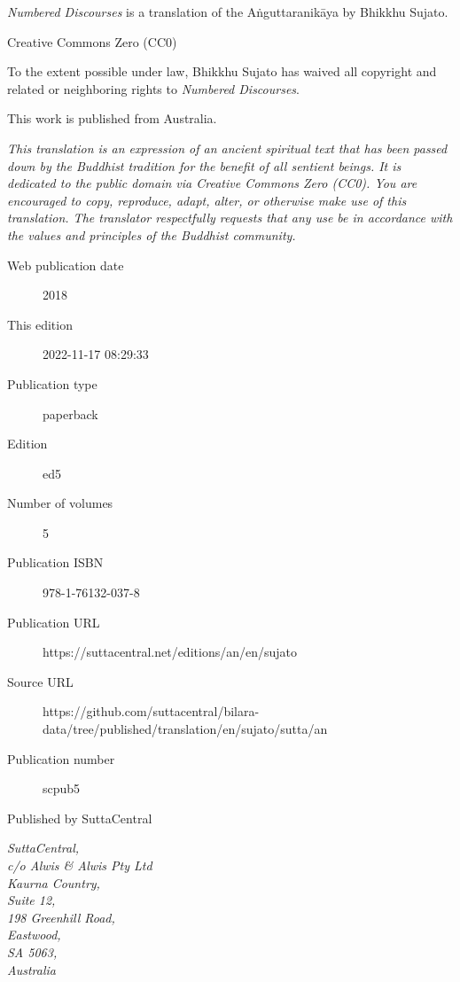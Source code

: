 \documentclass[12pt,openany]{book}%
\begin{document}
\begin{footnotesize}

\textit{Numbered Discourses} is a translation of the Aṅguttaranikāya by Bhikkhu Sujato.

\medskip

Creative Commons Zero (CC0)

To the extent possible under law, Bhikkhu Sujato has waived all copyright and related or neighboring rights to \textit{Numbered Discourses}.

\medskip

This work is published from Australia.

\begin{center}
\textit{This translation is an expression of an ancient spiritual text that has been passed down by the Buddhist tradition for the benefit of all sentient beings. It is dedicated to the public domain via Creative Commons Zero (CC0). You are encouraged to copy, reproduce, adapt, alter, or otherwise make use of this translation. The translator respectfully requests that any use be in accordance with the values and principles of the Buddhist community.}
\end{center}

\medskip

\begin{description}
    \item[Web publication date] 2018
    \item[This edition] 2022-11-17 08:29:33
    \item[Publication type] paperback
    \item[Edition] ed5
    \item[Number of volumes] 5
    \item[Publication ISBN] 978-1-76132-037-8
    \item[Publication URL] https://suttacentral.net/editions/an/en/sujato
    \item[Source URL] https://github.com/suttacentral/bilara-data/tree/published/translation/en/sujato/sutta/an
    \item[Publication number] scpub5
\end{description}

\medskip

Published by SuttaCentral

\medskip

\textit{SuttaCentral,\\
c/o Alwis \& Alwis Pty Ltd\\
Kaurna Country,\\
Suite 12,\\
198 Greenhill Road,\\
Eastwood,\\
SA 5063,\\
Australia}

\end{footnotesize}
\end{document}
